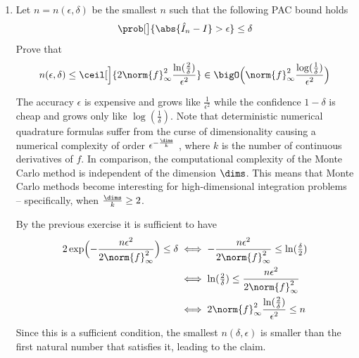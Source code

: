 \begin{exercise}
\begin{enumerate}[label=(\alph*), noitemsep]
        \item Let \(n = n(\epsilon, \delta)\) be the smallest \(n\) such that the following
        PAC bound holds
        \[
            \prob[\big]{\abs{\hat I_n - I} > \epsilon} \le \delta
        \]
        Prove that
        \[
            n(\epsilon, \delta)
            \le \ceil[\Big]{2\norm{f}_\infty^2\frac{\ln(\tfrac2\delta)}{\epsilon^2}}
            \in \bigO\Bigl(\norm{f}_\infty^2\frac{\log(\frac1\delta)}{\epsilon^2}\Bigr)
        \]
        \begin{remark}
            \label{rem: accuracy vs confidence}
            The accuracy \(\epsilon\) is expensive and grows like
            \(\frac1{\epsilon^2}\) while the confidence \(1-\delta\) is cheap and grows only
            like \(\log(\frac1\delta)\). Note that deterministic numerical quadrature
            formulas suffer from the curse of dimensionality causing a numerical
            complexity of order \(\epsilon^{-\frac{\dims}k}\) \citep[Sec.~1.3.12, Prop.~1]{novakDeterministicStochasticError1988}, where \(k\) is the
            number of continuous derivatives of \(f\). In comparison, the 
            computational complexity of the Monte Carlo method is independent of
            the dimension \(\dims\). This means that Monte Carlo methods become
            interesting for high-dimensional integration problems -- specifically,
            when \(\frac{\dims}k \ge 2\).
        \end{remark}
        \begin{solution}
            By the previous exercise it is sufficient to have
            \begin{align*}
                2\exp\Bigl(-\frac{n\epsilon^2}{2\norm{f}_\infty^2}\Bigr) \le \delta
                &\iff -\frac{n\epsilon^2}{2\norm{f}_\infty^2} \le \ln(\tfrac{\delta}2)
                \\
                &\iff \ln(\tfrac{2}\delta) \le \frac{n \epsilon^2}{2\norm{f}_\infty^2}
                \\
                &\iff 2\norm{f}_\infty^2 \frac{\ln(\tfrac2\delta)}{\epsilon^2} \le n
            \end{align*}
            Since this is a sufficient condition, the smallest \(n(\delta, \epsilon)\)
            is smaller than the first natural number that satisfies it, leading
            to the claim.
        \end{solution}
    \end{enumerate}
\end{exercise}


